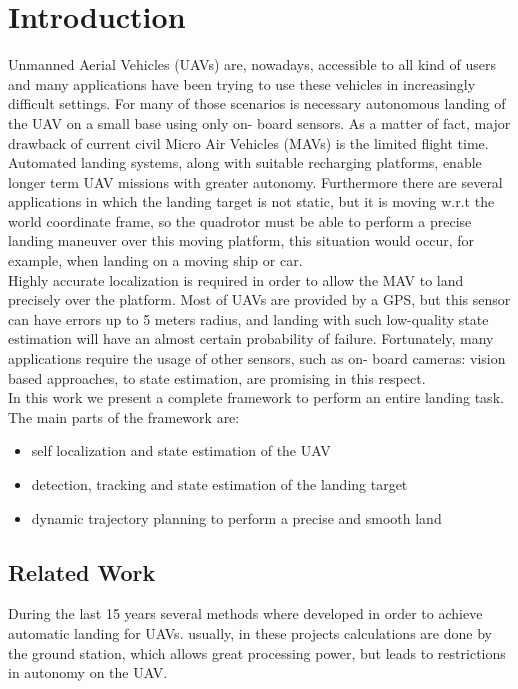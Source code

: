 \chapter{Introduction}\label{chap:introduction}
Unmanned Aerial Vehicles (UAVs) are, nowadays, accessible to all kind of users and many applications have been trying to use these vehicles in increasingly difficult settings. For many of those scenarios is necessary autonomous landing of the UAV on a small base using only on- board sensors. As a matter of fact, major drawback of current civil Micro Air Vehicles (MAVs) is the limited flight time. Automated landing systems, along with suitable recharging platforms, enable longer term UAV missions with greater autonomy. Furthermore there are several applications in which the landing target is not static, but it is moving w.r.t the world coordinate frame, so the quadrotor must be able to perform a precise landing maneuver over this moving platform, this situation would occur, for example, when landing on a moving ship or car.\\

Highly accurate localization is required in order to allow the MAV to land precisely over the platform. Most of UAVs are provided by a GPS, but this sensor can have errors up to 5 meters radius, and landing with such low-quality state estimation will have an almost certain probability of failure. Fortunately, many applications require the usage of other sensors, such as on- board cameras: vision based approaches, to state estimation, are promising in this respect.\\

In this work we present a complete framework to perform an entire landing task. The main parts of the framework are:
\begin{itemize}
\item self localization and state estimation of the UAV
\item detection, tracking and state estimation of the landing target
\item dynamic trajectory planning to perform a precise and smooth land
\end{itemize}
\section{Related Work}\label{sec:related_work}

During the last 15 years several methods where developed in order to achieve automatic landing for UAVs.
usually, in these projects calculations are done by the ground station, which allows great processing power, but leads to restrictions in autonomy on the UAV. \\

